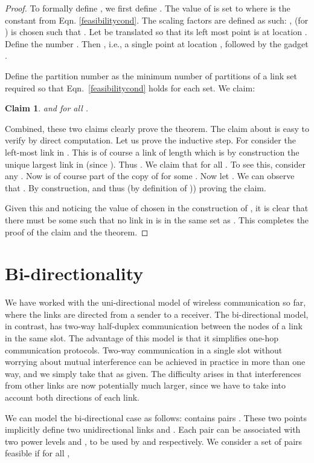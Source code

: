 \documentclass[11pt]{amsart}
\newcounter{foo}
\newtheorem{claim}[foo]{Claim}
\begin{document}
\begin{proof}
To formally define , we first define . The value of  is set to 
 where  is the constant from Eqn. \ref{feasibilitycond}. The scaling factors are defined as such: ,  (for ) is chosen such that
. Let  be  translated so that its left most point is at location . Define the number . Then , i.e., a single point at location , followed by the gadget . 

Define the partition number  as the minimum number of partitions of a link set required so that Eqn.~\ref{feasibilitycond}
holds for each set. We claim:
\begin{claim}
 and  for all .
\end{claim}
Combined, these two claims clearly prove the theorem. The claim about  is easy to verify by direct computation.
Let us prove the inductive step.
For  consider the left-most link  in . This is of course a link of length  which is by construction
the unique largest link in  (since ). 
Thus . 
We claim that
 for all . To see this, consider any . 
Now  is of course part of the  copy of  for some . 
Now let .
We can  observe that 
. By construction, 
 and thus 
 (by definition of )) proving the claim. 

Given this and noticing the value of  chosen in the construction of
, it is clear that there must be some  such that no link in 
is in the same set as . This completes the proof of the claim and the theorem.
\end{proof}


\section{Bi-directionality}
\label{sec:bidi}
We have worked with the uni-directional model of wireless communication so far, where the links are directed from
a sender to a receiver. The bi-directional model, in contrast, has
two-way half-duplex communication
between the nodes of a link in the same slot. The advantage of this model is that it simplifies one-hop communication protocols. Two-way communication in a single slot without worrying about mutual interference can be achieved in practice in more than one way,
and we simply take that as given. The difficulty arises in that interferences from other links are now potentially
much larger, since we have to take into account both directions of each link.

We can model the bi-directional case as follows:  contains
 pairs . These two points implicitly define two unidirectional links  and . Each pair can be associated with two power levels  and , to be used by 
 and  respectively. We consider a set of pairs  feasible if for all ,
\end{document}
